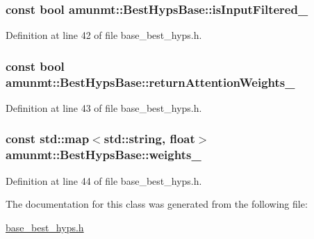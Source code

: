 \subsubsection[{\texorpdfstring{is\+Input\+Filtered\+\_\+}{isInputFiltered_}}]{\setlength{\rightskip}{0pt plus 5cm}const bool amunmt\+::\+Best\+Hyps\+Base\+::is\+Input\+Filtered\+\_\+\hspace{0.3cm}{\ttfamily [protected]}}\hypertarget{classamunmt_1_1BestHypsBase_a6906a24bd40784c66ba1772a314b826e}{}\label{classamunmt_1_1BestHypsBase_a6906a24bd40784c66ba1772a314b826e}


Definition at line 42 of file base\+\_\+best\+\_\+hyps.\+h.

\subsubsection[{\texorpdfstring{return\+Attention\+Weights\+\_\+}{returnAttentionWeights_}}]{\setlength{\rightskip}{0pt plus 5cm}const bool amunmt\+::\+Best\+Hyps\+Base\+::return\+Attention\+Weights\+\_\+\hspace{0.3cm}{\ttfamily [protected]}}\hypertarget{classamunmt_1_1BestHypsBase_a5c7d967963222a1a8cd64950830da217}{}\label{classamunmt_1_1BestHypsBase_a5c7d967963222a1a8cd64950830da217}


Definition at line 43 of file base\+\_\+best\+\_\+hyps.\+h.

\subsubsection[{\texorpdfstring{weights\+\_\+}{weights_}}]{\setlength{\rightskip}{0pt plus 5cm}const std\+::map$<$std\+::string, float$>$ amunmt\+::\+Best\+Hyps\+Base\+::weights\+\_\+\hspace{0.3cm}{\ttfamily [protected]}}\hypertarget{classamunmt_1_1BestHypsBase_aea7067ab791aa3e86dbc925e7b8eca9b}{}\label{classamunmt_1_1BestHypsBase_aea7067ab791aa3e86dbc925e7b8eca9b}


Definition at line 44 of file base\+\_\+best\+\_\+hyps.\+h.



The documentation for this class was generated from the following file\+:\begin{DoxyCompactItemize}
\item 
\hyperlink{base__best__hyps_8h}{base\+\_\+best\+\_\+hyps.\+h}\end{DoxyCompactItemize}
